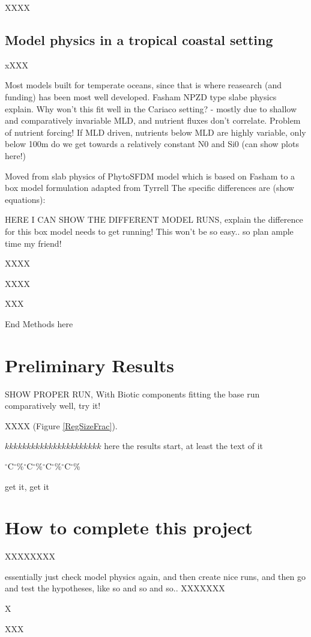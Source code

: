 XXXX

\subsection{Model physics in a tropical coastal setting}
xXXX

Most models built for temperate oceans, since that is where reasearch (and funding) has been most well developed. Fasham NPZD type slabe physics explain.
Why won't this fit well in the Cariaco setting? - mostly due to shallow and comparatively invariable MLD, and nutrient fluxes don't correlate.
Problem of nutrient forcing! If MLD driven, nutrients below MLD are highly variable, only below 100m do we get towards a relatively constant N0 and Si0 (can show plots here!)

Moved from slab physics of PhytoSFDM model \citep{Acevedo-Trejos2016} which is based on Fasham \citep{Evans2003,Fasham1990a} to a box model formulation adapted from Tyrrell \citep{Tyrrell1999}
The specific differences are (show equations):

HERE I CAN SHOW THE DIFFERENT MODEL RUNS, explain the difference
for this box model needs to get running! This won't be so easy.. so plan ample time my friend!

XXXX

XXXX

XXX


End Methods here

\section{Preliminary Results}


SHOW PROPER RUN, With Biotic components fitting the base run comparatively well, try it!

XXXX (Figure \ref{RegSizeFrac}).



$kkkkkkkkkkkkkkkkkkkkkk$ here the results start, at least the text of it

$^{\circ}$C$^{\circ}$\%$^{\circ}$C$^{\circ}$\%$^{\circ}$C$^{\circ}$\%$^{\circ}$C$^{\circ}$\%


get it, get it


\section{How to complete this project}
XXXXXXXX

essentially just check model physics again, and then
create nice runs, and then go and test the hypotheses, like so and so and so..
XXXXXXX

X

XXX

